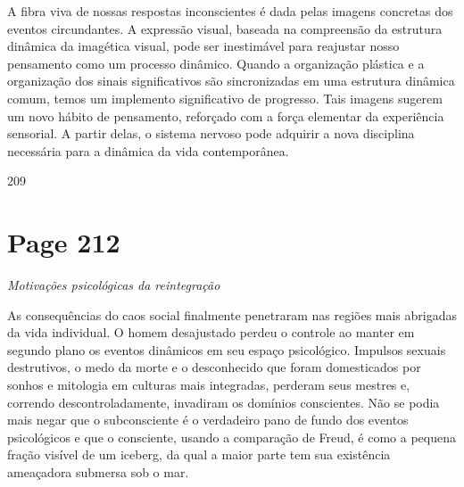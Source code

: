 \documentclass[a4paper]{article}
\begin{document}
A fibra viva de nossas respostas inconscientes é dada pelas imagens concretas dos eventos circundantes. A expressão visual, baseada na compreensão da estrutura dinâmica da imagética visual, pode ser inestimável para reajustar nosso pensamento como um processo dinâmico. Quando a organização plástica e a organização dos sinais significativos são sincronizadas em uma estrutura dinâmica comum, temos um implemento significativo de progresso. Tais imagens sugerem um novo hábito de pensamento, reforçado com a força elementar da experiência sensorial. A partir delas, o sistema nervoso pode adquirir a nova disciplina necessária para a dinâmica da vida contemporânea.

\vspace{\fill}
\begin{flushright}
209
\end{flushright}

\newpage
\section*{Page 212}

\begin{flushleft}
\textit{Motivações psicológicas da reintegração}
\end{flushleft}

As consequências do caos social finalmente penetraram nas regiões mais abrigadas da vida individual. O homem desajustado perdeu o controle ao manter em segundo plano os eventos dinâmicos em seu espaço psicológico. Impulsos sexuais destrutivos, o medo da morte e o desconhecido que foram domesticados por sonhos e mitologia em culturas mais integradas, perderam seus mestres e, correndo descontroladamente, invadiram os domínios conscientes. Não se podia mais negar que o subconsciente é o verdadeiro pano de fundo dos eventos psicológicos e que o consciente, usando a comparação de Freud, é como a pequena fração visível de um iceberg, da qual a maior parte tem sua existência ameaçadora submersa sob o mar.
\end{document}
